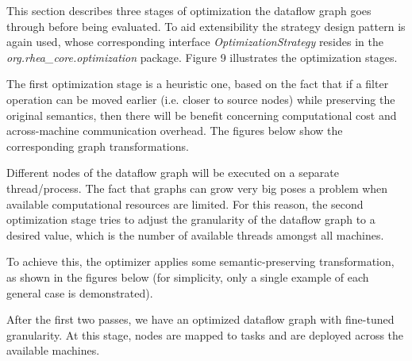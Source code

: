 \documentclass{dithesis}
\begin{document}

This section describes three stages of optimization the dataflow graph goes through before being evaluated. To aid extensibility  the strategy design pattern is again used, whose corresponding interface \textit{OptimizationStrategy} resides in the \textit{org.rhea\_core.optimization} package. Figure 9 illustrates the optimization stages.



The first optimization stage is a heuristic one, based on the fact that if a filter operation can be moved earlier (i.e. closer to source nodes) while preserving the original semantics, then there will be benefit concerning computational cost and across-machine communication overhead. The figures below show the corresponding graph transformations.



Different nodes of the dataflow graph will be executed on a separate thread/process. The fact that graphs can grow very big poses a problem when available computational resources are limited. For this reason, the second optimization stage tries to adjust the granularity of the dataflow graph to a desired value, which is the number of available threads amongst all machines. 

To achieve this, the optimizer applies some semantic-preserving transformation, as shown in the figures below (for simplicity, only a single example of each general case is demonstrated). 



After the first two passes, we have an optimized dataflow graph with fine-tuned granularity. At this stage, nodes are mapped to tasks and are deployed across the available machines. 
\end{document}
